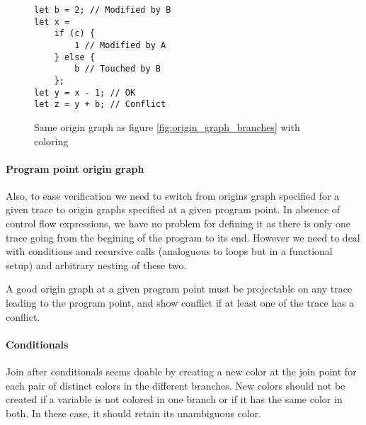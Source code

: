 \documentclass[a4paper,10pt]{article}
\begin{document}
\begin{figure}[ht]
\begin{minipage}{.5\textwidth}
\begin{lstlisting}
let b = 2; // Modified by B
let x =
    if (c) {
        1 // Modified by A
    } else {
        b // Touched by B
    };
let y = x - 1; // OK
let z = y + b; // Conflict
\end{lstlisting}
\end{minipage}\hfill
\begin{minipage}{.45\textwidth}
\centering{}
\end{minipage}
\caption{Same origin graph as figure \ref{fig:origin_graph_branches} with coloring}
\label{fig:origin_graph_branches_color}
\end{figure}

\paragraph{Program point origin graph} Also, to ease verification we need to switch from origins graph specified for a given trace to origin graphs specified at a given program point. In absence of control flow expressions, we have no problem for defining it as there is only one trace going from the begining of the program to its end. However we need to deal with conditions and recursive calls (analoguous to loops but in a functional setup) and arbitrary nesting of these two.

A good origin graph at a given program point must be projectable on any trace leading to the program point, and show conflict if at least one of the trace has a conflict.

\paragraph{Conditionals} Join after conditionals seems doable by creating a new color at the join point for each pair of distinct colors in the different branches. New colors should not be created if a variable is not colored in one branch or if it has the same color in both. In these case, it should retain its unambiguous color.
\end{document}
